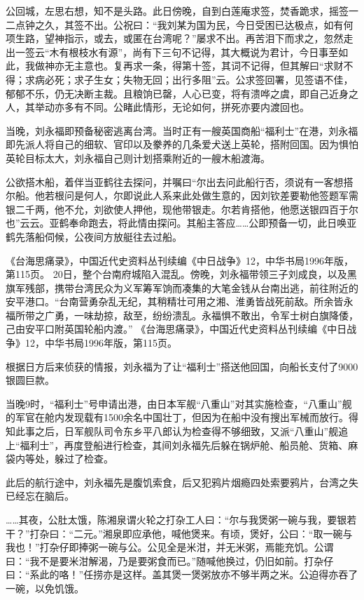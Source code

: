 \documentclass[12pt,UTF8]{ctexbook}
\begin{document}
公回城，左思右想，知不是头路。此日傍晚，自到白莲庵求签，焚香跪求，摇签一二点钟之久，其签不出。公祝曰：“我刘某为国为民，今日受困已达极点，如有何项生路，望神指示，或去，或匿在台湾呢？”屡求不出。再苦泪下而求之，忽然走出一签云“木有根枝水有源”，尚有下三句不记得，其大概说为君计，今日事至如此，我做神亦无主意也。复再求一条，得第十签，其词不记得，但其解曰“求财不得；求病必死；求子生女；失物无回；出行多阻”云。公求签回署，见签语不佳，郁郁不乐，仍无决断主裁。且粮饷已罄，人心已变，将有溃哗之虞，即自己近身之人，其举动亦多有不同。公睹此情形，无论如何，拼死亦要内渡回也。

当晚，刘永福即预备秘密逃离台湾。当时正有一艘英国商船“福利士”在港，刘永福即先派人将自己的细软、官印以及豢养的几条爱犬送上英轮，搭附回国。因为惧怕英轮目标太大，刘永福自己则计划搭乘附近的一艘木船渡海。

公欲搭木船，着伴当亚鹤往去探问，并嘱曰“尔出去问此船行否，须说有一客想搭尔船。他若根问是何人，尔即说此人系来此处做生意的，因刘钦差要勒他签题军需银二千两，他不允，刘欲使人押他，现他带银走。尔若肯搭他，他愿送银四百于尔也”云云。亚鹤奉命跑去，将此情由探问。其船主答应……公即预备一切，此日唤亚鹤先落船伺候，公夜间方放艇往去过船。

《台海思痛录》，中国近代史资料丛刊续编《中日战争》12，中华书局1996年版，第115页。
20日，整个台南府城陷入混乱。傍晚，刘永福带领三子刘成良，以及黑旗军残部，携带台湾民众为义军筹军饷而凑集的大笔金钱从台南出逃，前往附近的安平港口。“台南营勇杂乱无纪，其稍精壮可用之湘、淮勇皆战死前敌。所余皆永福所带之广勇，一味劫掠，敌至，纷纷溃乱。永福惧不敢出，令军士树白旗降倭，己由安平口附英国轮船内渡。” 《台海思痛录》，中国近代史资料丛刊续编《中日战争》12，中华书局1996年版，第115页。

根据日方后来侦获的情报，刘永福为了让“福利士”搭送他回国，向船长支付了9000银圆巨款。

当晚9时，“福利士”号申请出港，由日本军舰“八重山”对其实施检查，“八重山”舰的军官在舱内发现载有1500余名中国壮丁，但因为在船中没有搜出军械而放行。得知此事之后，日军舰队司令东乡平八郎认为检查得不够细致，又派“八重山”舰追上“福利士”，再度登船进行检查，其间刘永福先后躲在锅炉舱、船员舱、货箱、麻袋内等处，躲过了检查。

此后的航行途中，刘永福先是腹饥索食，后又犯鸦片烟瘾四处索要鸦片，台湾之失已经忘在脑后。

……其夜，公肚太饿，陈湘泉谓火轮之打杂工人曰：“尔与我煲粥一碗与我，要银若干？”打杂曰：“二元。”湘泉即应承他，喊他煲来。有顷，煲好，公曰：“取一碗与我也！”打杂仔即捧粥一碗与公。公见全是米泔，并无米粥，焉能充饥。公谓曰：“我不是要米泔解渴，乃是要粥食而已。”随喊他换过，仍旧如前。打杂仔曰：“系此的咯！”任捞亦是这样。盖其煲一煲粥放亦不够半两之米。公迫得亦吞了一碗，以免饥饿。
\end{document}
